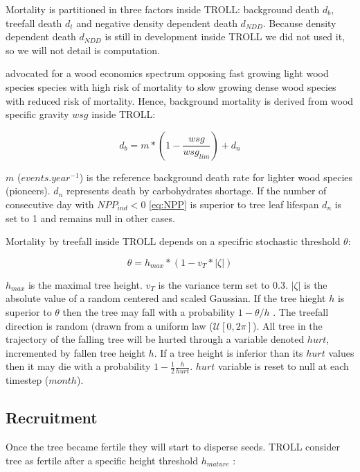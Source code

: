 \documentclass[12pt,]{article}
\theoremstyle{definition}
\theoremstyle{definition}
\theoremstyle{remark}
\begin{document}
Mortality is partitioned in three factors inside TROLL: background death
\(d_b\), treefall death \(d_t\) and negative density dependent death
\(d_{NDD}\). Because density dependent death \(d_{NDD}\) is still in
development inside TROLL we did not used it, so we will not detail is
computation.

\citet{chave_towards_2009} advocated for a wood economics spectrum
opposing fast growing light wood species species with high risk of
mortality to slow growing dense wood species with reduced risk of
mortality. Hence, background mortality is derived from wood specific
gravity \(wsg\) inside TROLL:

\begin{equation}
  d_b = m*(1-\frac{wsg}{wsg_{lim}})+d_n
  \label{eq:db}
\end{equation}

\(m\) (\(events.year^{-1}\)) is the reference background death rate for
lighter wood species (pioneers). \(d_n\) represents death by
carbohydrates shortage. If the number of consecutive day with
\(NPP_{ind} < 0\) \eqref{eq:NPP} is superior to tree leaf lifespan \(d_n\)
is set to 1 and remains null in other cases.

Mortality by treefall inside TROLL depends on a specifric stochastic
threshold \(\theta\):

\begin{equation}
  \theta = h_{max}*(1-v_T*|\zeta|)
  \label{eq:theta}
\end{equation}

\(h_{max}\) is the maximal tree height. \(v_T\) is the variance term set
to 0.3. \(|\zeta|\) is the absolute value of a random centered and
scaled Gaussian. If the tree hieght \(h\) is superior to \(\theta\) then
the tree may fall with a probability \(1-\theta/h\) \citep{Chave1999}.
The treefall direction is random (drawn from a uniform law
(\(\mathcal{U}[0,2\pi]\)). All tree in the trajectory of the falling
tree will be hurted through a variable denoted \(hurt\), incremented by
fallen tree height \(h\). If a tree height is inferior than its \(hurt\)
values then it may die with a probability
\(1-\frac{1}{2}\frac{h}{hurt}\). \(hurt\) variable is reset to null at
each timestep (\(month\)).

\subsection{Recruitment}\label{recruitment}

Once the tree became fertile they will start to disperse seeds. TROLL
consider tree as fertile after a specific height threshold
\(h_{mature}\) \citep{Wright2005}:
\end{document}
